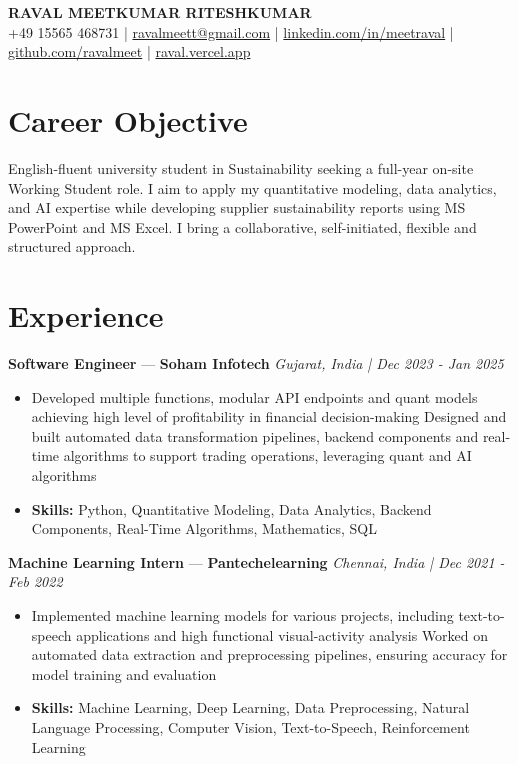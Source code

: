 \documentclass[a4paper,10pt]{article}
\begin{document}
\begin{center}
  {\Large\bfseries RAVAL MEETKUMAR RITESHKUMAR}\\[2pt]
  {\small +49 15565 468731 \;|\; \href{mailto:ravalmeett@gmail.com}{ravalmeett@gmail.com} \;|\; \href{https://www.linkedin.com/in/meetraval/}{linkedin.com/in/meetraval} \;|\; \href{https://github.com/ravalmeet}{github.com/ravalmeet} \;|\; \href{https://raval.vercel.app/}{raval.vercel.app}}
\end{center}
\vspace{-3pt}

\section*{Career Objective}
English-fluent university student in Sustainability seeking a full-year on-site Working Student role. I aim to apply my quantitative modeling, data analytics, and AI expertise while developing supplier sustainability reports using MS PowerPoint and MS Excel. I bring a collaborative, self-initiated, flexible and structured approach.\par

\section*{Experience}
\textbf{Software Engineer} — \textbf{Soham Infotech} \hfill \textit{Gujarat, India \;|\; Dec 2023 - Jan 2025}\par
\vspace{1pt}
\begin{itemize}
  \item Developed multiple functions, modular API endpoints and quant models achieving high level of profitability in financial decision-making Designed and built automated data transformation pipelines, backend components and real-time algorithms to support trading operations, leveraging quant and AI algorithms
  \item \textbf{Skills:} Python, Quantitative Modeling, Data Analytics, Backend Components, Real-Time Algorithms, Mathematics, SQL
\end{itemize}
\vspace{3pt}
\textbf{Machine Learning Intern} — \textbf{Pantechelearning} \hfill \textit{Chennai, India \;|\; Dec 2021 - Feb 2022}\par
\vspace{1pt}
\begin{itemize}
  \item Implemented machine learning models for various projects, including text-to-speech applications and high functional visual-activity analysis Worked on automated data extraction and preprocessing pipelines, ensuring accuracy for model training and evaluation
  \item \textbf{Skills:} Machine Learning, Deep Learning, Data Preprocessing, Natural Language Processing, Computer Vision, Text-to-Speech, Reinforcement Learning
\end{itemize}
\end{document}
